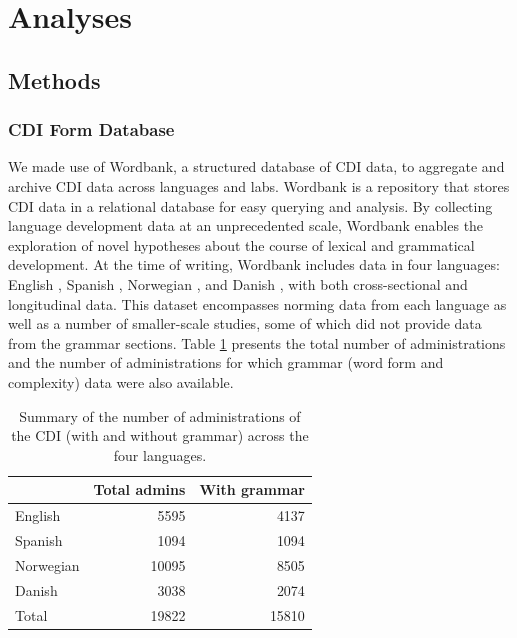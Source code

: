 \documentclass[10pt,letterpaper]{article}
\begin{document}
\section{Analyses}

\subsection{Methods}

\subsubsection{CDI Form Database}

We made use of Wordbank, a structured database of CDI data, to aggregate and archive CDI data across languages and labs. Wordbank is a repository that stores CDI data in a relational database for easy querying and analysis. By collecting language development data at an unprecedented scale, Wordbank enables the exploration of novel hypotheses about the course of lexical and grammatical development. At the time of writing, Wordbank includes data in four languages: English \cite{fenson2007}, Spanish \cite{jackson1993}, Norwegian \cite{simonsen2014}, and Danish \cite{bleses2008}, with both cross-sectional and longitudinal data. This dataset encompasses norming data from each language as well as a number of smaller-scale studies, some of which did not provide data from the grammar sections. Table \ref{table:num} presents the total number of administrations and the number of administrations for which grammar (word form and complexity) data were also available.

\begin{table}
\begin{center}
\begin{tabular}{lrr}
\hline
& Total admins & With grammar\\ 
\hline
English & 5595 & 4137\\ 
Spanish & 1094 & 1094\\ 
Norwegian & 10095 & 8505\\ 
Danish & 3038 & 2074\\ 
\hline
Total & 19822 & 15810 \\
\hline
\end{tabular}
\end{center}
\caption{\label{table:num} Summary of the number of administrations of the CDI (with and without grammar) across the four languages.}
\end{table}
\end{document}

